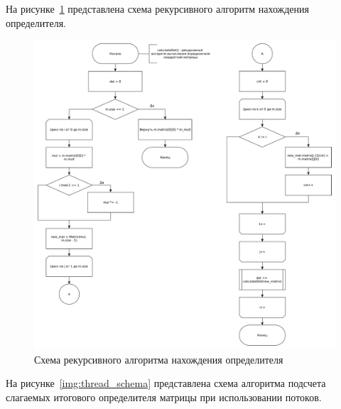 \documentclass[a4paper,oneside,14pt]{extreport}
\begin{document}
На рисунке~\ref{img:count_det} представлена схема рекурсивного алгоритм нахождения определителя.
\begin{figure}[H]
	\centering
	\includegraphics[width=1.00\linewidth]{images/count_det}
	\caption{Схема рекурсивного алгоритма нахождения определителя}
	\label{img:count_det}
\end{figure}

На рисунке~\ref{img:thread_schema} представлена схема алгоритма подсчета слагаемых итогового определителя матрицы
при использовании потоков.
\end{document}
